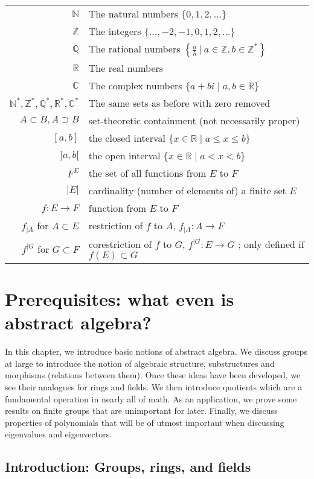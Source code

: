 \documentclass{book}
\newcommand{\N}{\mathbb{N}}
\newcommand{\Z}{\mathbb{Z}}
\newcommand{\Q}{\mathbb{Q}}
\newcommand{\R}{\mathbb{R}}
\newcommand{\C}{\mathbb{C}}
\theoremstyle{plain}
\theoremstyle{definition}
\theoremstyle{remark}
\begin{document}
\renewcommand{\arraystretch}{1.2}
\begin{tabular}{rp{}}
  $\N$ & The natural numbers $\{0,1,2,\dots\}$ \\
  $\Z$ & The integers $\{\dots,-2,-1,0,1,2,\dots\}$ \\
  $\Q$ & The rational numbers $\left\{\frac{a}{b} \: \Big| \: a \in \Z, b \in \Z^* \right\}$ \\
  $\R$ & The real numbers \\
  $\C$ & The complex numbers $\{a+bi \mid a,b \in \R\}$ \\
  $\N^*,\Z^*, \Q^*, \R^*, \C^*$ & The same sets as before with zero removed \\
  $A \subset B, A \supset B$ & set-theoretic containment (not necessarily proper) \\
  $[a,b]$ & the closed interval $\{x \in \R \mid a \le x \le b\}$\\
  $]a,b[$ & the open interval $\{x \in \R \mid a < x < b\}$ \\
  $F^E$ & the set of all functions from $E$ to $F$ \\
  $|E|$ & cardinality (number of elements of) a finite set $E$ \\
  $f : E \to F$ & function from $E$ to $F$ \\
  $f_{\mid A}$ for $A \subset E$ & restriction of $f$ to $A$, $f_{\mid A} : A \to F$ \\
  $f^{\mid G}$ for $G \subset F$ & corestriction of $f$ to $G$, $f^{\mid G} : E \to G$ ; only defined if $f(E) \subset G$
\end{tabular}


\chapter{Prerequisites: what even is abstract algebra?}

In this chapter, we introduce basic notions of abstract algebra. We discuss groups at large to introduce the notion of algebraic structure, substructures and morphisms (relations between them). Once these ideas have been developed, we see their analogues for rings and fields. We then introduce quotients which are a fundamental operation in nearly all of math. As an application, we prove some results on finite groups that are unimportant for later. Finally, we discuss properties of polynomials that will be of utmost important when discussing eigenvalues and eigenvectors.

\section{Introduction: Groups, rings, and fields}
\end{document}
